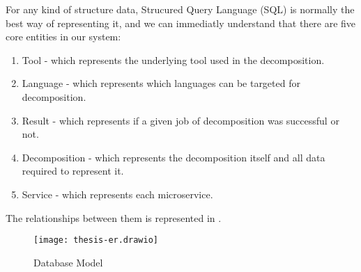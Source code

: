 For any kind of structure data, Strucured Query Language (SQL) is normally the best way of representing it, and we can immediatly understand that there are five core entities in our system:

\begin{enumerate}
  \item Tool - which represents the underlying tool used in the decomposition.
  \item Language - which represents which languages can be targeted for decomposition.
  \item Result - which represents if a given job of decomposition was successful or not.
  \item Decomposition - which represents the decomposition itself and all data required to represent it.
  \item Service - which represents each microservice.
\end{enumerate}

The relationships between them is represented in .

\begin{figure*}[!htb]
  \caption{Database Model}
  \label{fig:database-model}
  \centering
  \texttt{[image: thesis-er.drawio]}
\end{figure*}

